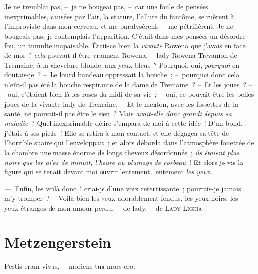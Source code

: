 \documentclass[french,twoside]{book} %
\begin{document}
Je ne tremblai pas, – je ne bougeai pas, – car une foule de pensées inexprimables, causées par l’air, la stature, l’allure du fantôme, se ruèrent à l’improviste dans mon cerveau, et me paralysèrent, – me pétrifièrent. Je ne bougeais pas, je contemplais l’apparition. C’était dans mes pensées un désordre fou, un tumulte inapaisable. Était-ce bien la \emph{vivante} Rowena que j’avais en face de moi ? \emph{cela} pouvait-il être vraiment Rowena, – lady Rowena Trevanion de Tremaine, à la chevelure blonde, aux yeux bleus ? Pourquoi, oui, \emph{pourquoi} en doutais-je ? – Le lourd bandeau oppressait la bouche ; – pourquoi donc cela n’eût-il pas été la bouche respirante de la dame de Tremaine ? – Et les joues ? – oui, c’étaient bien là les roses du midi de sa vie ; – oui, ce pouvait être les belles joues de la vivante lady de Tremaine. – Et le menton, avec les fossettes de la santé, ne pouvait-il pas être le sien ? Mais \emph{avait-elle donc grandi depuis sa maladie} ? Quel inexprimable délire s’empara de moi à cette idée ! D’un bond, j’étais à ses pieds ! Elle se retira à mon contact, et elle dégagea sa tête de l’horrible suaire qui l’enveloppait ; et alors déborda dans l’atmosphère fouettée de la chambre une masse énorme de longs cheveux désordonnés ; \emph{ils étaient plus noirs que les ailes de minuit, l’heure au plumage de corbeau} ! Et alors je vis la figure qui se tenait devant moi ouvrir lentement, lentement \emph{les yeux.}\par
\emph{—} Enfin, les voilà donc ! criai-je d’une voix retentissante ; pourrais-je jamais m’y tromper ? – Voilà bien les yeux adorablement fendus, les yeux noirs, les yeux étranges de mon amour perdu, – de lady, – de {\scshape Lady Ligeia !}
\section[{Metzengerstein}]{Metzengerstein}\renewcommand{\leftmark}{Metzengerstein}

\noindent Pestis eram vivus, – moriens tua mors ero.\par
\end{document}
